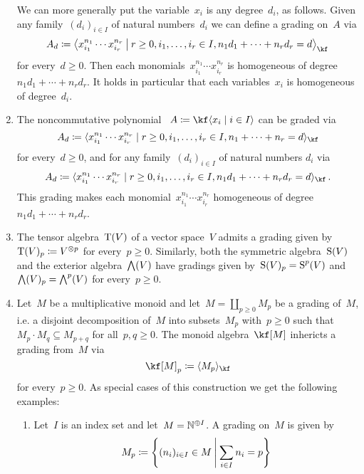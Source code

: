 \begin{examples}
\begin{enumerate}
			We can more generally put the variable~$x_i$ is any degree~$d_i$, as follows.
			Given any family~$(d_i)_{i \in I}$ of natural numbers~$d_i$ we can define a grading on~$A$ via
			\[
				A_d
				\defined
				\gen[\big]{
					x_{i_1}^{n_1} \dotsm x_{i_r}^{n_r}
				\suchthat[\big]
					r \geq 0,
					i_1, \dotsc, i_r \in I,
					n_1 d_1 + \dotsb + n_r d_r = d
				}_{\kf}
			\]
			for every~$d \geq 0$.
			Then each monomials~$x_{i_1}^{n_1} \dotsm x_{i_r}^{n_r}$ is homogeneous of degree~$n_1 d_1 + \dotsb + n_r d_r$.
			It holds in particular that each variables~$x_i$ is homogeneous of degree~$d_i$.
		\item
			The noncommutative polynomial \algebra{$\kf$}~$A \defined \kf\gen{x_i \suchthat i \in I}$ can be graded via
			\[
				A_d
				\defined
				\gen{
					x_{i_1}^{n_1} \dotsm x_{i_r}^{n_r}
				\suchthat
					r \geq 0,
					i_1, \dotsc, i_r \in I,
					n_1 + \dotsb + n_r = d
				}_{\kf}
			\]
			for every~$d \geq 0$, and for any family~$(d_i)_{i \in I}$ of natural numbers $d_i$ via
			\[
				A_d
				\defined
				\gen{
					x_{i_1}^{n_1} \dotsm x_{i_r}^{n_r}
				\suchthat
					r \geq 0,
					i_1, \dotsc, i_r \in I,
					n_1 d_1 + \dotsb + n_r d_r = d
				}_{\kf} \,.
			\]
			This grading makes each monomial~$x_{i_1}^{n_1} \dotsm x_{i_r}^{n_r}$ homogeneous of degree~$n_1 d_1 + \dotsb + n_r d_r$.
		\item
			The tensor algebra~$\operatorname{T}(V)$ of a vector space~$V$ admits a grading given by~$\operatorname{T}(V)_p \coloneqq V^{\otimes p}$ for every~$p \geq 0$.
			Similarly, both the symmetric algebra~$\operatorname{S}(V)$ and the exterior algebra~$\operatorname{\bigwedge}(V)$ have gradings given by~$\operatorname{S}(V)_p = \operatorname{S}^p(V)$ and~$\operatorname{\bigwedge}(V)_p = \operatorname{\bigwedge}^p(V)$ for every~$p \geq 0$.
		\item
			Let~$M$ be a multiplicative monoid and let~$M = \coprod_{p \geq 0} M_p$ be a grading of~$M$, i.e. a disjoint decomposition of~$M$ into subsets~$M_p$ with~$p \geq 0$ such that~$M_p \cdot M_q \subseteq M_{p+q}$ for all~$p, q \geq 0$.
			The monoid algebra~$\kf[M]$ inhericts a grading from~$M$ via
			\[
				\kf[M]_p
				\defined
				\gen{ M_p }_{\kf}
			\]
			for every~$p \geq 0$.
			As special cases of this construction we get the following examples:
			\begin{enumerate}
				\item
					Let~$I$ is an index set and let~$M = \mathbb{N}^{\oplus I}$.
					A grading on~$M$ is given by
					\[
						M_p
						\defined
						\left\{
							(n_i)_{i \in I} \in M
						\suchthat*
							\sum_{i \in I} n_i = p
						\right\}
					\]

\end{enumerate}
\end{enumerate}
\end{examples}

